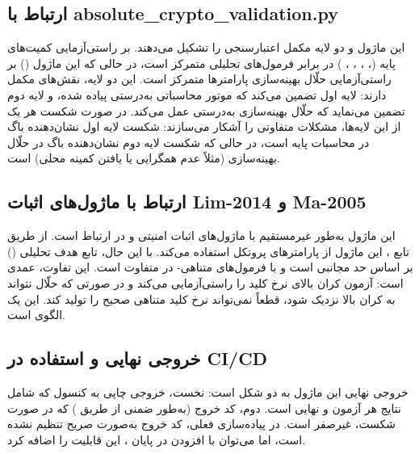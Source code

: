 \subsection{ارتباط با absolute\_crypto\_validation.py}

این ماژول و  دو لایه مکمل اعتبارسنجی را تشکیل می‌دهند.  بر راستی‌آزمایی کمیت‌های پایه (، ، ، ، ) در برابر فرمول‌های تحلیلی متمرکز است، در حالی که این ماژول () بر راستی‌آزمایی حلّال بهینه‌سازی پارامترها متمرکز است. این دو لایه، نقش‌های مکمل دارند: لایه اول تضمین می‌کند که موتور محاسباتی به‌درستی پیاده شده، و لایه دوم تضمین می‌نماید که حلّال بهینه‌سازی به‌درستی عمل می‌کند. در صورت شکست هر یک از این لایه‌ها، مشکلات متفاوتی را آشکار می‌سازند: شکست لایه اول نشان‌دهنده باگ در محاسبات پایه است، در حالی که شکست لایه دوم نشان‌دهنده باگ در حلّال بهینه‌سازی (مثلاً عدم همگرایی یا یافتن کمینه محلی) است.

\subsection{ارتباط با ماژول‌های اثبات Lim-2014 و Ma-2005}

این ماژول به‌طور غیرمستقیم با ماژول‌های اثبات امنیتی  و  در ارتباط است. از طریق تابع ، این ماژول از پارامترهای پروتکل  استفاده می‌کند. با این حال، تابع هدف تحلیلی () بر اساس حد مجانبی است و با فرمول‌های متناهی- در  متفاوت است. این تفاوت، عمدی است: آزمون کران بالای نرخ کلید را راستی‌آزمایی می‌کند و در صورتی که حلّال نتواند به کران بالا نزدیک شود، قطعاً نمی‌تواند نرخ کلید متناهی صحیح را تولید کند. این یک الگوی  است.

\subsection{خروجی نهایی و استفاده در CI/CD}

خروجی نهایی این ماژول به دو شکل است: نخست، خروجی چاپی به کنسول که شامل نتایج هر آزمون و  نهایی است. دوم، کد خروج  (به‌طور ضمنی از طریق ) که در صورت شکست، غیرصفر است. در پیاده‌سازی فعلی، کد خروج به‌صورت صریح تنظیم نشده است، اما می‌توان با افزودن  در پایان ، این قابلیت را اضافه کرد.

